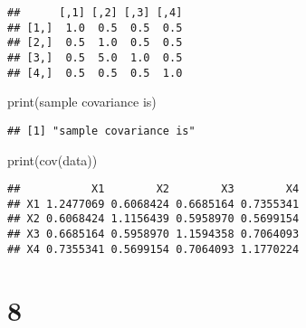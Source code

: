 \documentclass[
]{article}
\newenvironment{Shaded}{\begin{snugshade}}{\end{snugshade}}
\newcommand{\FunctionTok}[1]{\textcolor[rgb]{0.00,0.00,0.00}{#1}}
\newcommand{\NormalTok}[1]{#1}
\newcommand{\StringTok}[1]{\textcolor[rgb]{0.31,0.60,0.02}{#1}}
\begin{document}
\begin{verbatim}
##      [,1] [,2] [,3] [,4]
## [1,]  1.0  0.5  0.5  0.5
## [2,]  0.5  1.0  0.5  0.5
## [3,]  0.5  5.0  1.0  0.5
## [4,]  0.5  0.5  0.5  1.0
\end{verbatim}

\begin{Shaded}
\begin{Highlighting}[]
\FunctionTok{print}\NormalTok{(}\StringTok{\textquotesingle{}sample covariance is\textquotesingle{}}\NormalTok{)}
\end{Highlighting}
\end{Shaded}

\begin{verbatim}
## [1] "sample covariance is"
\end{verbatim}

\begin{Shaded}
\begin{Highlighting}[]
\FunctionTok{print}\NormalTok{(}\FunctionTok{cov}\NormalTok{(data))}
\end{Highlighting}
\end{Shaded}

\begin{verbatim}
##           X1        X2        X3        X4
## X1 1.2477069 0.6068424 0.6685164 0.7355341
## X2 0.6068424 1.1156439 0.5958970 0.5699154
## X3 0.6685164 0.5958970 1.1594358 0.7064093
## X4 0.7355341 0.5699154 0.7064093 1.1770224
\end{verbatim}

\hypertarget{section-7}{%
\section{8}\label{section-7}}
\end{document}
